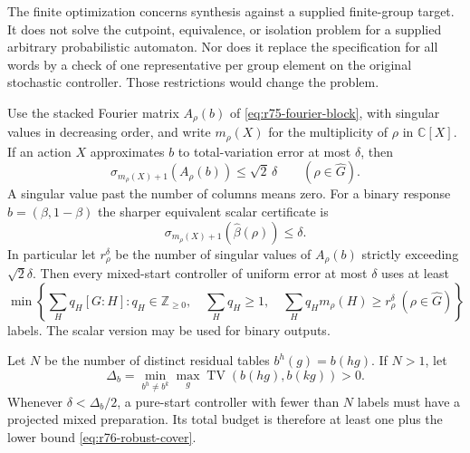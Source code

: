 The finite optimization concerns synthesis against a supplied finite-group
target. It does not solve the cutpoint, equivalence, or isolation problem
for a supplied arbitrary probabilistic automaton. Nor does it replace
the specification for all words by a check of one representative per group
element on the original stochastic controller. Those restrictions would
change the problem.

\begin{theorem}
\label{thm:r76-robust-multiplicity}
Use the stacked Fourier matrix $A_\rho(b)$ of
\eqref{eq:r75-fourier-block}, with singular values in decreasing order,
and write $m_\rho(X)$ for the multiplicity of $\rho$ in
$\mathbb C[X]$. If an action $X$ approximates $b$ to total-variation
error at most $\delta$, then
\begin{equation}\label{eq:r76-fourier-robust}
 \sigma_{m_\rho(X)+1}(A_\rho(b))\le\sqrt2\,\delta
                       \qquad(\rho\in\widehat G).
\end{equation}
A singular value past the number of columns means zero. For a binary
response $b=(\beta,1-\beta)$ the sharper equivalent scalar certificate is
\begin{equation}\label{eq:r76-binary-robust}
 \sigma_{m_\rho(X)+1}(\widehat\beta(\rho))\le\delta.
\end{equation}
In particular let $r_\rho^\delta$ be the number of singular values of
$A_\rho(b)$ strictly exceeding $\sqrt2\delta$. Then every mixed-start
controller of uniform error at most $\delta$ uses at least
\begin{equation}\label{eq:r76-robust-cover}
 \min\left\{\sum_H q_H[G:H]:q_H\in\mathbb Z_{\ge0},\quad
       \sum_Hq_H\ge1,\quad
       \sum_Hq_Hm_\rho(H)\ge r_\rho^\delta\ (\rho\in\widehat G)
       \right\}
\end{equation}
labels. The scalar version may be used for binary outputs.

Let $N$ be the number of distinct residual tables $b^h(g)=b(hg)$.
If $N>1$, let
\[
 \Delta_b=\min_{b^h\ne b^k}\max_g
                \operatorname{TV}(b(hg),b(kg))>0.
\]
Whenever $\delta<\Delta_b/2$, a pure-start controller with fewer than
$N$ labels must have a projected mixed preparation. Its total budget
is therefore at least one plus the lower bound
\eqref{eq:r76-robust-cover}.
\end{theorem}
